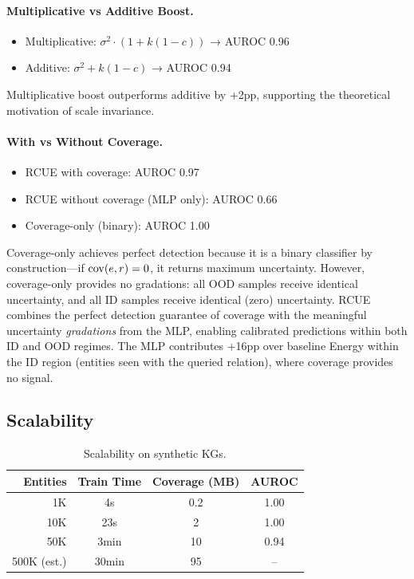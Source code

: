 \paragraph{Multiplicative vs Additive Boost.}
\begin{itemize}
    \item Multiplicative: $\sigma^2 \cdot (1 + k(1-c))$ → AUROC 0.96
    \item Additive: $\sigma^2 + k(1-c)$ → AUROC 0.94
\end{itemize}

Multiplicative boost outperforms additive by +2pp, supporting the theoretical motivation of scale invariance.

\paragraph{With vs Without Coverage.}
\begin{itemize}
    \item RCUE with coverage: AUROC 0.97
    \item RCUE without coverage (MLP only): AUROC 0.66
    \item Coverage-only (binary): AUROC 1.00
\end{itemize}

Coverage-only achieves perfect detection because it is a binary classifier by construction---if $\mathrm{cov}(e,r)=0$, it returns maximum uncertainty. However, coverage-only provides no gradations: all OOD samples receive identical uncertainty, and all ID samples receive identical (zero) uncertainty. RCUE combines the perfect detection guarantee of coverage with the meaningful uncertainty \emph{gradations} from the MLP, enabling calibrated predictions within both ID and OOD regimes. The MLP contributes +16pp over baseline Energy within the ID region (entities seen with the queried relation), where coverage provides no signal.

\subsection{Scalability}

\begin{table}[h]
\centering
\caption{Scalability on synthetic KGs.}
\label{tab:scale}
\begin{tabular}{rccc}
\toprule
Entities & Train Time & Coverage (MB) & AUROC \\
\midrule
1K & 4s & 0.2 & 1.00 \\
10K & 23s & 2 & 1.00 \\
50K & 3min & 10 & 0.94 \\
500K (est.) & 30min & 95 & -- \\
\bottomrule
\end{tabular}
\end{table}

